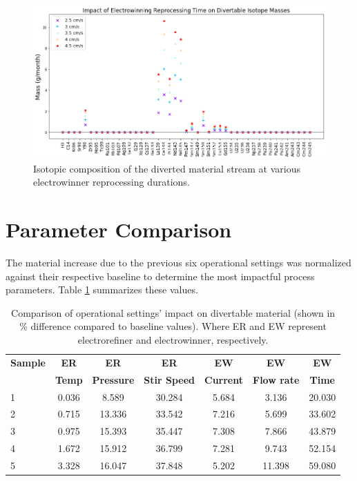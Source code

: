\begin{figure}
	\includegraphics[width=\linewidth]{images/time-sa-diff}
	\caption{Isotopic composition of the diverted material stream at various electrowinner reprocessing durations.}
	\label{fig:win-time-diff}
\end{figure}

\FloatBarrier

\section{Parameter Comparison}

The material increase due to the previous six operational settings was normalized against their respective baseline
to determine the most impactful process parameters. Table \ref{tab:compare} summarizes these values.

\begin{table}[h!]
	\centering
	\begin{tabularx}{0.9\linewidth}{lcccccc}
		\hline
		\textbf{Sample} & \textbf{ER} & \textbf{ER} & \textbf{ER} & \textbf{EW}
		& \textbf{EW} & \textbf{EW} \\
		& \textbf{Temp} & \textbf{Pressure} & \textbf{Stir Speed} & \textbf{Current} & \textbf{Flow rate} & \textbf{Time} \\
		\hline \hline
		1 & 0.036 & 8.589 & 30.284 & 5.684 & 3.136 & 20.030 \\ \hline
		2 & 0.715 & 13.336 & 33.542 & 7.216 & 5.699 & 33.602 \\ \hline
		3 & 0.975 & 15.393 & 35.447 & 7.308 & 7.866 & 43.879 \\ \hline
		4 & 1.672 & 15.912 & 36.799 & 7.281 & 9.743 & 52.154 \\ \hline
		5 & 3.328 & 16.047 & 37.848 & 5.202 & 11.398 & 59.080 \\ \hline
	\end{tabularx}
	\caption {Comparison of operational settings' impact on divertable material (shown in
		\% difference compared to baseline values). Where ER and EW represent electrorefiner and electrowinner, respectively.}
	\label {tab:compare}
\end{table}

